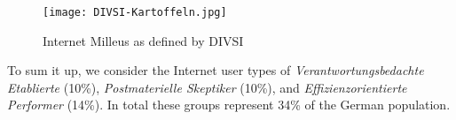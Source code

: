 \begin{figure}[hHtbp]
\centering
\texttt{[image: DIVSI-Kartoffeln.jpg]}
\caption{Internet Milleus as defined by DIVSI}
\label{fig:divsi_kartoffeln}
\end{figure}

To sum it up, we consider the Internet user types of \textit{Verantwortungsbedachte Etablierte} (10\%),  \textit{Postmaterielle Skeptiker} (10\%), and \textit{Effizienzorientierte Performer} (14\%). In total these groups represent 34\% of the German population.
